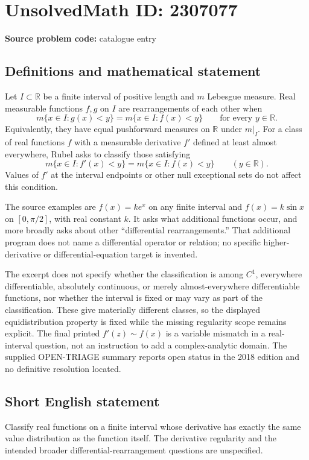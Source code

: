 \documentclass[11pt]{article}
\newcommand{\R}{\mathbb{R}}
\begin{document}
\section*{UnsolvedMath ID: 2307077}
\textbf{Source problem code:} catalogue entry
\subsection{Definitions and mathematical statement}
Let \(I\subset\R\) be a finite interval of positive length and \(m\) Lebesgue measure. Real measurable functions \(f,g\) on \(I\) are rearrangements of each other when
\[
m\{x\in I:g(x)<y\}=m\{x\in I:f(x)<y\}
\qquad\text{for every }y\in\R.
\]
Equivalently, they have equal pushforward measures on \(\R\) under \(m|_I\). For a class of real functions \(f\) with a measurable derivative \(f'\) defined at least almost everywhere, Rubel asks to classify those satisfying
\[
m\{x\in I:f'(x)<y\}=m\{x\in I:f(x)<y\}
\qquad(y\in\R).
\]
Values of \(f'\) at the interval endpoints or other null exceptional sets do not affect this condition.

The source examples are \(f(x)=ke^x\) on any finite interval and \(f(x)=k\sin x\) on \([0,\pi/2]\), with real constant \(k\). It asks what additional functions occur, and more broadly asks about other ``differential rearrangements.'' That additional program does not name a differential operator or relation; no specific higher-derivative or differential-equation target is invented.

The excerpt does not specify whether the classification is among \(C^1\), everywhere differentiable, absolutely continuous, or merely almost-everywhere differentiable functions, nor whether the interval is fixed or may vary as part of the classification. These give materially different classes, so the displayed equidistribution property is fixed while the missing regularity scope remains explicit. The final printed \(f'(z)\sim f(x)\) is a variable mismatch in a real-interval question, not an instruction to add a complex-analytic domain. The supplied OPEN-TRIAGE summary reports open status in the 2018 edition and no definitive resolution located.
\subsection{Short English statement}
Classify real functions on a finite interval whose derivative has exactly the same value distribution as the function itself. The derivative regularity and the intended broader differential-rearrangement questions are unspecified.
\end{document}
